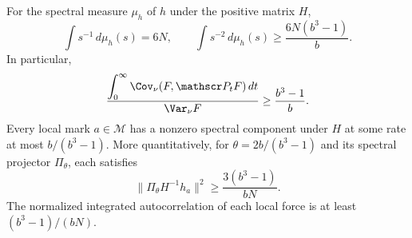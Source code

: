 \begin{theorem}
For the spectral measure $\mu_h$ of $h$ under the positive matrix $H$,
\[
 \int s^{-1}\,d\mu_h(s)=6N,\qquad
 \int s^{-2}\,d\mu_h(s)\ge\frac{6N(b^3-1)}b.
\]
In particular,
\begin{equation}\label{round26:iat}
 \frac{\displaystyle\int_0^\infty\Cov_\nu(F,\mathscr P_tF)\,dt}
      {\Var_\nu F}\ge\frac{b^3-1}b.
\end{equation}
Every local mark $a\in\mathcal M$ has a nonzero spectral component under
$H$ at some rate at most $b/(b^3-1)$. More quantitatively, for
$\theta=2b/(b^3-1)$ and its spectral projector $\Pi_\theta$, each satisfies
\begin{equation}\label{round26:overlap}
 \|\Pi_\theta H^{-1}h_a\|^2\ge\frac{3(b^3-1)}{bN}.
\end{equation}
The normalized integrated autocorrelation of each local force is at least
$(b^3-1)/(bN)$.
\end{theorem}

